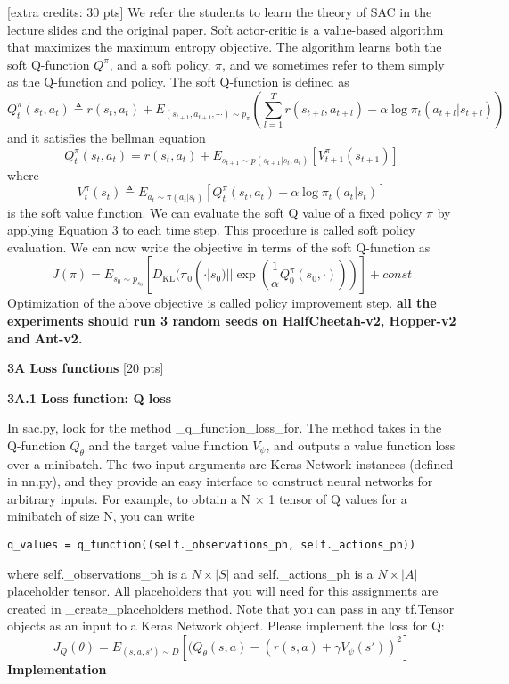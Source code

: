 \documentclass{article}
\begin{document}
 
  [extra credits: 30 pts] 
We refer the students to learn the theory of SAC in the lecture slides and the original paper.
Soft actor-critic is a value-based algorithm that maximizes the maximum entropy objective. The algorithm learns both the soft Q-function $Q^\pi$, and a soft policy, $\pi$, and we sometimes refer
to them simply as the Q-function and policy. The soft Q-function is defined as
$$
Q_t^\pi(s_t, a_t) \triangleq r(s_t, a_t) + E_{(s_{t+1}, a_{t+1}, \cdots) \sim p_\pi}(\sum_{l=1}^T r(s_{t+l}, a_{t+l})-\alpha \log \pi_t(a_{t+l}|s_{t+l}))
$$
and it satisfies the bellman equation
$$
Q_t^\pi(s_t, a_t) = r(s_t, a_t) + E_{s_{t+1} \sim p(s_{t+1}|s_t, a_t)}[V_{t+1}^\pi(s_{t+1})]
$$
where 
$$
V_{t}^\pi(s_{t}) \triangleq E_{a_{t} \sim \pi(a_t|s_t)}[Q_t^\pi(s_t, a_t) -\alpha \log \pi_t(a_{t}|s_{t})]
$$
is the soft value function. We can evaluate the soft Q value of a fixed policy $\pi$ by applying Equation 3 to each time step. This procedure is called soft policy
evaluation. We can now write the objective in terms of the soft Q-function as 
$$
J(\pi) = E_{s_0 \sim p_{s_0}} [D_{\text{KL}}(\pi_0(\cdot|s_0)||\exp(\frac{1}{\alpha}Q_0^\pi(s_0, \cdot)))] + const
$$
Optimization of the above objective is called policy improvement step.  {\bf all the experiments should run 3 random seeds on HalfCheetah-v2, Hopper-v2 and Ant-v2.}

\vskip 0.5in
{\bf 3A Loss functions} [20 pts]

{\bf 3A.1 Loss function: Q loss}

In sac.py, look for the method \_q\_function\_loss\_for. The method takes in the Q-function $Q_\theta$ and the target value function $V_\psi$, and outputs a value
function loss over a minibatch. The two input arguments are Keras Network instances (defined in nn.py), and they provide an easy interface to construct neural networks for arbitrary inputs. For example, to obtain a N × 1 tensor of Q values for a minibatch of size N, you can write 
\begin{verbatim}
q_values = q_function((self._observations_ph, self._actions_ph))
\end{verbatim}
where self.\_observations\_ph is a $N \times |S|$ and self.\_actions\_ph is a $N \times|A|$
placeholder tensor. All placeholders that you will need for this assignments are
created in \_create\_placeholders method. Note that you can pass in any tf.Tensor objects as an input to a Keras Network object. Please implement the loss for Q:
$$
J_Q(\theta)=E_{(s,a,s') \sim D}[(Q_\theta(s,a)-(r(s,a)+ \gamma V_\psi(s'))^2]
$$
{\bf Implementation} 
\end{document}
